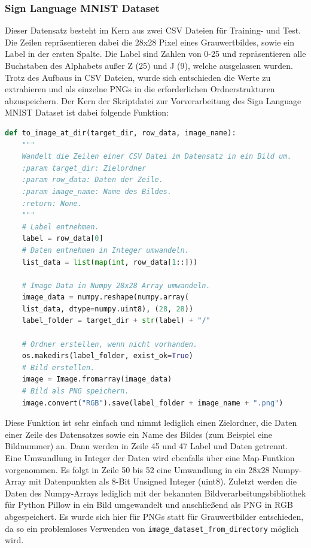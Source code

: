 \documentclass[11pt,bibliography=totocnumbered]{scrartcl}
\begin{document}
\subsubsection{Sign Language MNIST Dataset}
Dieser Datensatz besteht im Kern aus zwei CSV Dateien für Training- und Test. Die Zeilen repräsentieren dabei die 28x28 Pixel eines Grauwertbildes, sowie ein Label in der ersten Spalte. Die Label sind Zahlen von 0-25 und repräsentieren alle Buchstaben des Alphabets außer Z (25) und J (9), welche ausgelassen wurden. Trotz des Aufbaus in CSV Dateien, wurde sich entschieden die Werte zu extrahieren und als einzelne PNGs in die erforderlichen Ordnerstrukturen abzuspeichern. Der Kern der Skriptdatei zur Vorverarbeitung des Sign Language MNIST Dataset ist dabei folgende Funktion:
\begin{lstlisting}[language=python,firstnumber=36,caption={Kern der Sign Language MNIST Dataset Vorverarbeitung.},label=lst:to_image_at_dir]
def to_image_at_dir(target_dir, row_data, image_name):
	"""
	Wandelt die Zeilen einer CSV Datei im Datensatz in ein Bild um.
	:param target_dir: Zielordner
	:param row_data: Daten der Zeile.
	:param image_name: Name des Bildes.
	:return: None.
	"""
	# Label entnehmen.
	label = row_data[0]
	# Daten entnehmen in Integer umwandeln.
	list_data = list(map(int, row_data[1::]))
	
	# Image Data in Numpy 28x28 Array umwandeln.
	image_data = numpy.reshape(numpy.array(
	list_data, dtype=numpy.uint8), (28, 28))
	label_folder = target_dir + str(label) + "/"
	
	# Ordner erstellen, wenn nicht vorhanden.
	os.makedirs(label_folder, exist_ok=True)
	# Bild erstellen.
	image = Image.fromarray(image_data)
	# Bild als PNG speichern.
	image.convert("RGB").save(label_folder + image_name + ".png")
\end{lstlisting}
Diese Funktion ist sehr einfach und nimmt lediglich einen Zielordner, die Daten einer Zeile des Datensatzes sowie ein Name des Bildes (zum Beispiel eine Bildnummer) an. Dann werden in Zeile 45 und 47 Label und Daten getrennt. Eine Umwandlung in Integer der Daten wird ebenfalls über eine Map-Funtkion vorgenommen. Es folgt in Zeile 50 bis 52 eine Umwandlung in ein 28x28 Numpy-Array mit Datenpunkten als 8-Bit Unsigned Integer (uint8). Zuletzt werden die Daten des Numpy-Arrays lediglich mit der bekannten Bildverarbeitungsbibliothek für Python Pillow in ein Bild umgewandelt und anschließend als PNG in RGB abgespeichert. Es wurde sich hier für PNGs statt für Grauwertbilder entschieden, da so ein problemloses Verwenden von \lstinline[language=pythoninline]|image_dataset_from_directory| möglich wird.
\end{document}
